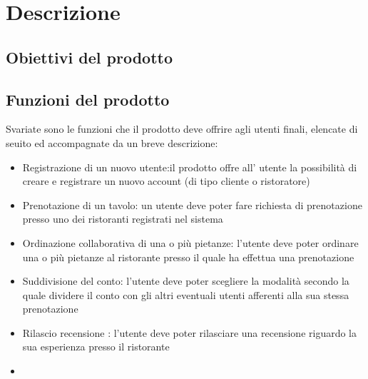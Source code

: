 \section{Descrizione }
\subsection{Obiettivi del prodotto}
\subsection{Funzioni del prodotto}

Svariate sono le funzioni che il prodotto deve offrire agli utenti finali,
elencate di seuito ed accompagnate da un breve descrizione:

\begin{itemize}
    \item Registrazione di un nuovo utente:il prodotto offre all' utente la
     possibilità di creare e registrare un nuovo account (di tipo cliente o ristoratore)
    \item Prenotazione di un tavolo: un utente deve poter fare richiesta di prenotazione 
     presso uno dei ristoranti registrati nel sistema
    \item Ordinazione collaborativa di una o più pietanze: l'utente deve poter ordinare una o più pietanze
    al ristorante presso il quale ha effettua una prenotazione
    \item Suddivisione del conto: l'utente deve poter scegliere la modalità secondo la quale dividere il
    conto con gli altri eventuali utenti afferenti alla sua stessa prenotazione
    \item Rilascio recensione : l'utente deve poter rilasciare una recensione riguardo la sua
    esperienza presso il ristorante 
    \item 
\end{itemize}
